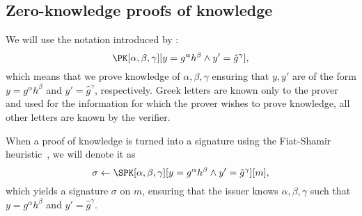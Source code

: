 \subsection{Zero-knowledge proofs of knowledge}%
\label{ZKPK}

We will use the notation introduced by \citet{PKnotation}:
\begin{equation}\label{PKexample}
  \PK[\alpha, \beta, \gamma][y = g^\alpha h^\beta \land y' = \hat g^\gamma],
\end{equation}
which means that we prove knowledge of \(\alpha, \beta, \gamma\) ensuring that \(y, y'\) are of the form \(y = g^\alpha h^\beta\) and \(y' = \hat g^\gamma\), respectively.
Greek letters are known only to the prover and used for the information for which the prover wishes to prove knowledge, all other letters are known by the verifier.

When a proof of knowledge is turned into a signature using the Fiat-Shamir heuristic~\cite{FiatShamirHeuristic}, we will denote it as
\begin{equation*}\label{SPKexample}
  \sigma\gets \SPK[\alpha, \beta, \gamma]%
  [y = g^\alpha h^\beta \land y' = \hat g^\gamma]%
  [m],
\end{equation*}
which yields a signature \(\sigma\) on \(m\), ensuring that the issuer knows \(\alpha, \beta, \gamma\) such that \(y = g^\alpha h^\beta\) and \(y' = \hat{g}^\gamma\).



